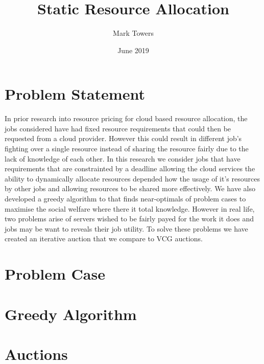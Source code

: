 \documentclass[fleqn]{article}
\title{Static Resource Allocation}
\author{Mark Towers}
\date{June 2019}
\begin{document}
\maketitle

\section{Problem Statement}\label{sec:problem-statement}
In prior research into resource pricing for cloud based resource allocation, the jobs considered have had
fixed resource requirements that could then be requested from a cloud provider. However this could result in
different job's fighting over a single resource instead of sharing the resource fairly due to the lack of knowledge of each other.
In this research we consider jobs that have requirements that are constrainted by a deadline allowing the
cloud services the ability to dynamically allocate resources depended how the usage of it's resources by other jobs
and allowing resources to be shared more effectively. We have also developed a greedy algorithm to that finds near-optimals
of problem cases to maximise the social welfare where there it total knowledge. However in real life, two problems arise of
servers wished to be fairly payed for the work it does and jobs may be want to reveals their job utility.
To solve these problems we have created an iterative auction that we compare to VCG auctions.

\section{Problem Case}\label{sec:problem-case}


\section{Greedy Algorithm}\label{sec:greedy-algorithm}


\section{Auctions}\label{sec:auction-idea}

\end{document}
